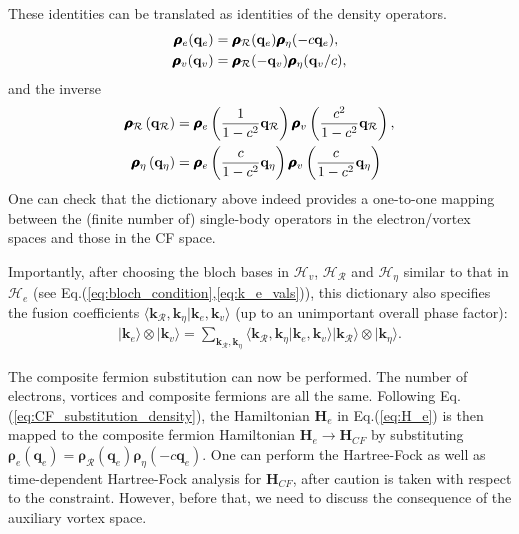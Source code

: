 These identities can be translated as identities of the density operators.
\begin{align}
\pmb{\boldsymbol\rho}_e(\mathbf q_e)&=\pmb{\boldsymbol\rho}_{\mathcal R}(\mathbf q_e)\pmb{\boldsymbol\rho}_{\eta}(-c\mathbf q_e),\notag\\
\pmb{\boldsymbol\rho}_v(\mathbf q_v)&=\pmb{\boldsymbol\rho}_{\mathcal R}(-\mathbf q_v)\pmb{\boldsymbol\rho}_{\eta}(\mathbf q_v/c),\label{eq:CF_substitution_density}
\end{align}
and the inverse
\begin{align}
\pmb{\boldsymbol\rho}_{\mathcal R}\left(\mathbf q_{\mathcal R}\right)&=\pmb{\boldsymbol\rho}_e\left(\frac{1}{1-c^2}\mathbf q_{\mathcal R}\right)\pmb{\boldsymbol\rho}_v\left(\frac{c^2}{1-c^2}\mathbf q_{\mathcal R}\right),\notag\\
\pmb{\boldsymbol\rho}_{\eta}\left(\mathbf q_{\eta}\right)&=\pmb{\boldsymbol\rho}_e\left(\frac{c}{1-c^2}\mathbf q_{\eta}\right)\pmb{\boldsymbol\rho}_v\left(\frac{c}{1-c^2}\mathbf q_{\eta}\right)
\end{align}
One can check that the dictionary above indeed provides a one-to-one mapping between the (finite number of) single-body operators in the electron/vortex spaces and those in the CF space. 

Importantly, after choosing the bloch bases in $\mathcal H_v$, $\mathcal H_{\mathcal R}$ and $\mathcal H_{\eta}$ similar to that in $\mathcal H_e$ (see Eq.(\ref{eq:bloch_condition},\ref{eq:k_e_vals})), this dictionary also specifies the fusion coefficients $\langle  \mathbf k_{\mathcal R},\mathbf k_{\eta}  |\mathbf k_e,\mathbf k_v\rangle$ (up to an unimportant overall phase factor):
\begin{align}
|\mathbf k_e\rangle\otimes |\mathbf k_v\rangle = \sum_{\mathbf k_{\mathcal R},\mathbf k_{\eta}} \langle  \mathbf k_{\mathcal R},\mathbf k_{\eta}  |\mathbf k_e,\mathbf k_v\rangle |\mathbf k_{\mathcal R}\rangle\otimes |\mathbf k_{\eta}\rangle.\label{eq:CG_coeff}
\end{align}


The composite fermion substitution can now be performed. The number of electrons, vortices and composite fermions are all the same. Following Eq.(\ref{eq:CF_substitution_density}), the Hamiltonian $\mathbf H_e$ in Eq.(\ref{eq:H_e}) is then mapped to the composite fermion Hamiltonian $\mathbf H_e\rightarrow \mathbf H_{CF}$ by substituting $\pmb{\boldsymbol\rho}_e(\mathbf q_e)=\pmb{\boldsymbol\rho}_{\mathcal R}(\mathbf q_e)\pmb{\boldsymbol\rho}_{\eta}(-c\mathbf q_e)$. One can perform the Hartree-Fock as well as time-dependent Hartree-Fock analysis for $\mathbf H_{CF}$, after caution is taken with respect to the constraint. However, before that, we need to discuss the consequence of the auxiliary vortex space.

